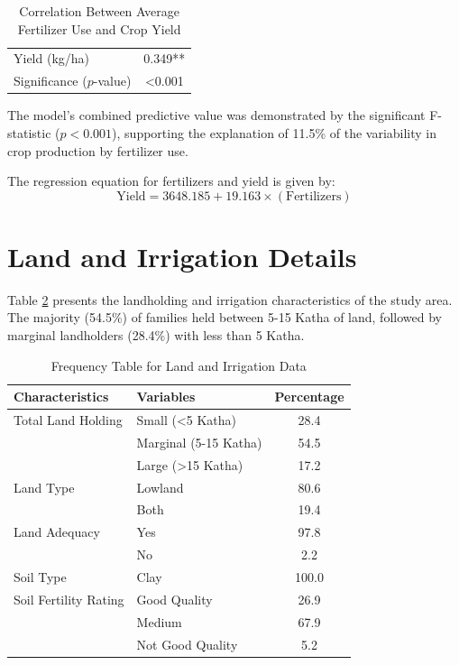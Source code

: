 \begin{table}[h]
    \centering
    \caption{Correlation Between Average Fertilizer Use and Crop Yield}
    \label{tab:fertilizer_correlation}
    \begin{tabular}{lc}
        \toprule
        Yield (kg/ha) & 0.349** \\
        Significance ($p$-value) & <0.001 \\
        \bottomrule
    \end{tabular}
\end{table}

The model's combined predictive value was demonstrated by the significant F-statistic ($p < 0.001$), supporting the explanation of 11.5\% of the variability in crop production by fertilizer use.

The regression equation for fertilizers and yield is given by:
\begin{equation}
    \text{Yield} = 3648.185 + 19.163 \times (\text{Fertilizers})
\end{equation}

\section{Land and Irrigation Details}

Table \ref{tab:land_details} presents the landholding and irrigation characteristics of the study area. The majority (54.5\%) of families held between 5-15 Katha of land, followed by marginal landholders (28.4\%) with less than 5 Katha.

\begin{table}[h]
    \centering
    \caption{Frequency Table for Land and Irrigation Data}
    \label{tab:land_details}
    \begin{tabular}{llc}
        \toprule
        Characteristics & Variables & Percentage \\
        \midrule
        Total Land Holding & Small (<5 Katha) & 28.4 \\
        & Marginal (5-15 Katha) & 54.5 \\
        & Large (>15 Katha) & 17.2 \\
        Land Type & Lowland & 80.6 \\
        & Both & 19.4 \\
        Land Adequacy & Yes & 97.8 \\
        & No & 2.2 \\
        Soil Type & Clay & 100.0 \\
        Soil Fertility Rating & Good Quality & 26.9 \\
        & Medium & 67.9 \\
        & Not Good Quality & 5.2 \\
        \bottomrule
    \end{tabular}
\end{table}

